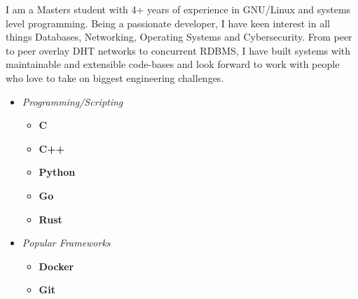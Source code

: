 \documentclass[9]{Resume}
\begin{document}
\begin{minipage}[t]{0.45\textwidth}
	\vspace{-\baselineskip}

		I am a Masters student with 4+ years of experience in GNU/Linux and systems level programming.
		Being a passionate developer, I have keen interest in all things Databases, Networking, Operating Systems and Cybersecurity.
		From peer to peer overlay DHT networks to concurrent RDBMS, I have built systems with maintainable and extensible code-bases and look forward to work with people who love to take on biggest engineering challenges.
\end{minipage}
\hfill
\begin{minipage}[t]{0.45\textwidth}
	\vspace{-\baselineskip}

	\begin{itemize}[noitemsep,nolistsep,leftmargin=*]
	\setlength\itemsep{-1em}
	\item[]\textit{Programming/Scripting}
			\vspace{-1em}
			\begin{multicols}{2}
			\begin{itemize}[leftmargin=*]
			\setlength\itemsep{-0.25em}
				\item[]\textbf{C}\hspace{48pt}
				\item[]\textbf{C++}\hspace{37pt}
				\item[]\textbf{Python}\hspace{25pt}
				\item[]\textbf{Go}\hspace{28pt}
				\item[]\textbf{Rust}\hspace{21pt}
			\end{itemize}
			\end{multicols}

	\item[]\textit{Popular Frameworks}
			\vspace{-1em}
			\begin{multicols}{2}
			\begin{itemize}[leftmargin=*]
			\setlength\itemsep{-0.25em}
				\item[]\textbf{Docker}\hspace{25pt}\meter{4}
				\item[]\textbf{Git}\hspace{27pt}\meter{4}
			\end{itemize}
			\end{multicols}


\end{itemize}
\end{minipage}
\end{document}
